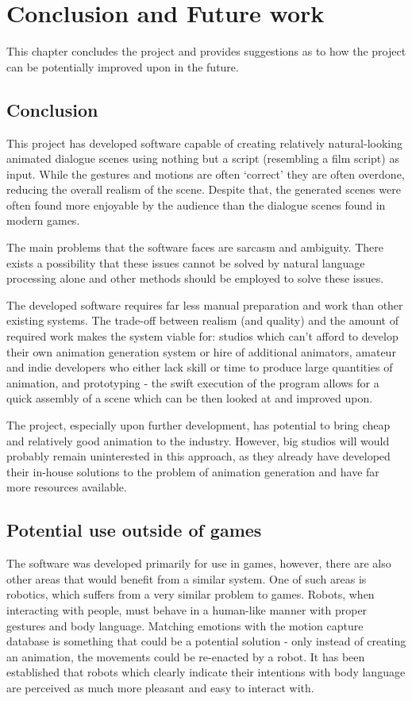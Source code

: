 \chapter{Conclusion and Future work \label{chap:conclusion}}
This chapter concludes the project and provides suggestions as to how the project can be potentially improved upon in the future.

\section{Conclusion}
This project has developed software capable of creating relatively natural-looking animated dialogue scenes using nothing but a script (resembling a film script) as input. While the gestures and motions are often `correct' they are often overdone, reducing the overall realism of the scene. Despite that, the generated scenes were often found more enjoyable by the audience than the dialogue scenes found in modern games.

The main problems that the software faces are sarcasm and ambiguity. There exists a possibility that these issues cannot be solved by natural language processing alone and other methods should be employed to solve these issues.

The developed software requires far less manual preparation and work than other existing systems. The trade-off between realism (and quality) and the amount of required work makes the system viable for: studios which can't afford to develop their own animation generation system or hire of additional animators, amateur and indie developers who either lack skill or time to produce large quantities of animation, and prototyping - the swift execution of the program allows for a quick assembly of a scene which can be then looked at and improved upon.

The project, especially upon further development, has potential to bring cheap and relatively good animation to the industry. However, big studios will would probably remain uninterested in this approach, as they already have developed their in-house solutions to the problem of animation generation and have far more resources available.

\section{Potential use outside of games}
The software was developed primarily for use in games, however, there are also other areas that would benefit from a similar system. One of such areas is robotics, which suffers from a very similar problem to games. Robots, when interacting with people, must behave in a human-like manner with proper gestures and body language. Matching emotions with the motion capture database is something that could be a potential solution - only instead of creating an animation, the movements could be re-enacted by a robot. It has been established that robots which clearly indicate their intentions with body language are perceived as much more pleasant and easy to interact with.~\cite{mutlurobots}



